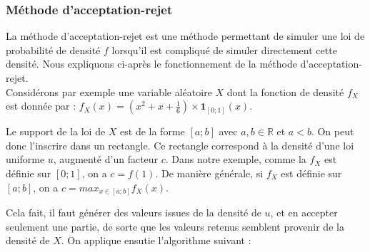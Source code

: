 \documentclass{article}
\begin{document}
\subsubsection{Méthode d'acceptation-rejet}
\label{sssec:acceptationRejet}
La méthode d'acceptation-rejet est une méthode permettant de simuler une loi de probabilité de densité $f$ lorsqu'il est compliqué de simuler directement cette densité. Nous expliquons ci-après le fonctionnement de la méthode d'acceptation-rejet.\\
Considérons par exemple une variable aléatoire $X$ dont la fonction de densité $f_X$ est donnée par : $f_X(x) = (x^2 + x + \frac{1}{6}) \times \mathbf{1}_{[0;1]}(x)$.
\begin{center}
\end{center}
Le support de la loi de $X$ est de la forme $[a;b]$ avec $a,b \in \mathbb{R}$ et $a < b$. On peut donc l'inscrire dans un rectangle. Ce rectangle correspond à la densité d'une loi uniforme $u$, augmenté d'un facteur $c$. Dans notre exemple, comme la $f_X$ est définie sur $[0;1]$, on a $c = f(1)$. De manière générale, si $f_X$ est définie sur $[a;b]$, on a $c = max_{x \in [a;b]} f_X(x)$.
\begin{center}
\end{center}
Cela fait, il faut générer des valeurs issues de la densité de $u$, et en accepter seulement une partie, de sorte que les valeurs retenus semblent provenir de la densité de $X$. On applique ensutie l'algorithme suivant :
\end{document}
